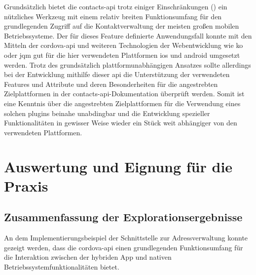 Grundsätzlich bietet die \gls{contacts-api} trotz einiger Einschränkungen (\so) ein nützliches Werkzeug mit einem relativ breiten Funktionsumfang für den grundlegenden Zugriff auf die Kontaktverwaltung der meisten großen mobilen Betriebssysteme.
Der für dieses Feature definierte Anwendungsfall konnte mit den Mitteln der \gls{cordova}-\gls{api} und weiteren Technologien der Webentwicklung wie \gls{ko} oder \gls{jqm} gut für die hier verwendeten Plattformen \gls{ios} und \gls{android} umgesetzt werden.
Trotz des grundsätzlich plattformunabhängigen Ansatzes sollte allerdings bei der Entwicklung mithilfe dieser \gls{api} die Unterstützung der verwendeten Features und Attribute und deren Besonderheiten für die angestrebten Zielplattformen in der \gls{contacts-api}-Dokumentation überprüft werden.
Somit ist eine Kenntnis über die angestrebten Zielplattformen für die Verwendung eines solchen \glspl{plugin} beinahe unabdingbar und die Entwicklung spezieller Funktionalitäten in gewisser Weise wieder ein Stück weit abhängiger von den verwendeten Plattformen. %



\chapter{Auswertung und Eignung für die Praxis} %


\section{Zusammenfassung der Explorationsergebnisse}

An dem Implementierungsbeispiel der Schnittstelle zur Adressverwaltung konnte gezeigt werden, dass die \gls{cordova}-\gls{api} einen grundlegenden Funktionsumfang für die Interaktion zwischen der hybriden App und nativen Betriebssystemfunktionalitäten bietet.	%

